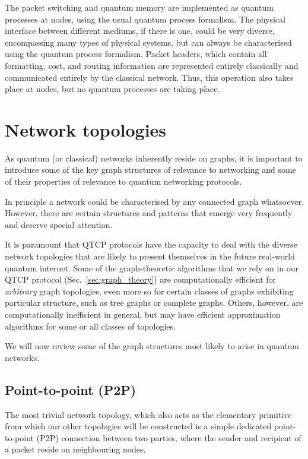 \documentclass[aps,rmp,twocolumn,amsmath,amssymb,nofootinbib,superscriptaddress,longbibliography,floatfix,table-of-contents,eqsecnum]{revtex4-1}
\begin{document}
The packet switching and quantum memory are implemented as quantum processes at nodes, using the usual quantum process formalism. The physical interface between different mediums, if there is one, could be very diverse, encompassing many types of physical systems, but can always be characterised using the quantum process formalism. Packet headers, which contain all formatting, cost, and routing information are represented entirely classically and communicated entirely by the classical network. Thus, this operation also takes place at nodes, but no quantum processes are taking place.

%
%

\section{Network topologies} 

As quantum (or classical) networks inherently reside on graphs, it is important to introduce some of the key graph structures of relevance to networking and some of their properties of relevance to quantum networking protocols.

In principle a network could be characterised by any connected graph whatsoever. However, there are certain structures and patterns that emerge very frequently and deserve special attention.

It is paramount that QTCP protocols have the capacity to deal with the diverse network topologies that are likely to present themselves in the future real-world quantum internet. Some of the graph-theoretic algorithms that we rely on in our QTCP protocol (Sec.~\ref{sec:graph_theory}) are computationally efficient for \textit{arbitrary} graph topologies, even more so for certain classes of graphs exhibiting particular structure, such as tree graphs or complete graphs. Others, however, are computationally inefficient in general, but may have efficient approximation algorithms for some or all classes of topologies.

We will now review some of the graph structures most likely to arise in quantum networks.

%
%

\subsection{Point-to-point (P2P)} 

The most trivial network topology, which also acts as the elementary primitive from which our other topologies will be constructed is a simple dedicated point-to-point (P2P) connection between two parties, where the sender and recipient of a packet reside on neighbouring nodes.
\end{document}
